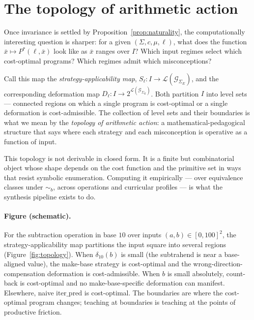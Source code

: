 \documentclass[11pt]{article}
\begin{document}
\section{The topology of arithmetic action}
\label{sec:topology}

Once invariance is settled by Proposition~\ref{prop:naturality}, the
computationally interesting question is sharper: for a given
$(\Sigma, c, \mu, \ell)$, what does the function
$\bar{x} \mapsto P^*(\ell, \bar{x})$ look like as $\bar{x}$ ranges
over $I$? Which input regimes select which cost-optimal programs?
Which regimes admit which misconceptions?

Call this map the \emph{strategy-applicability map}, $S_\ell : I \to
\mathcal{L}(\mathcal{G}_{\Sigma_E})$, and the corresponding
deformation map $D_\ell : I \to 2^{\mathcal{L}(\mathcal{G}_{\Sigma_E})}$.
Both partition $I$ into level sets — connected regions on which a
single program is cost-optimal or a single deformation is
cost-admissible. The collection of level sets and their boundaries is
what we mean by the \emph{topology of arithmetic action}: a
mathematical-pedagogical structure that says where each strategy and
each misconception is operative as a function of input.

This topology is not derivable in closed form. It is a finite but
combinatorial object whose shape depends on the cost function and the
primitive set in ways that resist symbolic enumeration. Computing it
empirically — over equivalence classes under $\sim_b$, across
operations and curricular profiles — is what the synthesis pipeline
exists to do.

\paragraph{Figure (schematic).}
For the subtraction operation in base $10$ over inputs $(a, b) \in
[0, 100]^2$, the strategy-applicability map partitions the input
square into several regions (Figure~\ref{fig:topology}). When
$\delta_{10}(b)$ is small (the subtrahend is near a base-aligned
value), the make-base strategy is cost-optimal and the
wrong-direction-compensation deformation is cost-admissible. When
$b$ is small absolutely, count-back is cost-optimal and no
make-base-specific deformation can manifest. Elsewhere, naive
$\mathrm{iter\_pred}$ is cost-optimal. The boundaries are where the
cost-optimal program changes; teaching at boundaries is teaching at
the points of productive friction.
\end{document}
